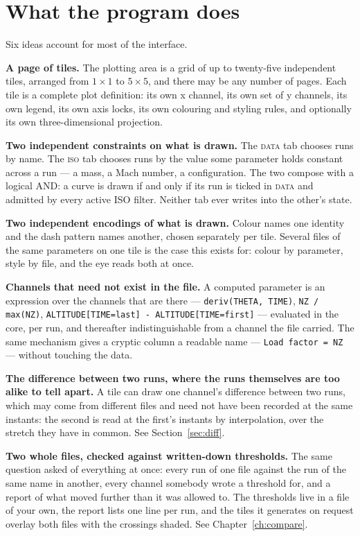 \documentclass[11pt,a4paper,oneside]{report}
\newcommand{\code}[1]{\texttt{#1}}
\newcommand{\tab}[1]{\textsc{#1}}
\begin{document}
\section{What the program does}

Six ideas account for most of the interface.

\textbf{A page of tiles.} The plotting area is a grid of up to twenty-five
independent tiles, arranged from $1 \times 1$ to $5 \times 5$, and there may be
any number of pages. Each tile is a complete plot definition: its own x channel,
its own set of y channels, its own legend, its own axis locks, its own colouring
and styling rules, and optionally its own three-dimensional projection.

\textbf{Two independent constraints on what is drawn.} The \tab{data} tab
chooses runs by name. The \tab{iso} tab chooses runs by the value some parameter
holds constant across a run --- a mass, a Mach number, a configuration. The two
compose with a logical AND: a curve is drawn if and only if its run is ticked in
\tab{data} and admitted by every active ISO filter. Neither tab ever writes into
the other's state.

\textbf{Two independent encodings of what is drawn.} Colour names one identity
and the dash pattern names another, chosen separately per tile. Several files of
the same parameters on one tile is the case this exists for: colour by
parameter, style by file, and the eye reads both at once.

\textbf{Channels that need not exist in the file.} A computed parameter is an
expression over the channels that are there ---
\code{deriv(THETA, TIME)}, \code{NZ / max(NZ)},
\code{ALTITUDE[TIME=last] - ALTITUDE[TIME=first]} --- evaluated in the core,
per run, and thereafter indistinguishable from a channel the file carried. The
same mechanism gives a cryptic column a readable name --- \code{Load factor =
NZ} --- without touching the data.

\textbf{The difference between two runs, where the runs themselves are too
alike to tell apart.} A tile can draw one channel's difference between two runs,
which may come from different files and need not have been recorded at the same
instants: the second is read at the first's instants by interpolation, over the
stretch they have in common. See Section~\ref{sec:diff}.

\textbf{Two whole files, checked against written-down thresholds.} The same
question asked of everything at once: every run of one file against the run of
the same name in another, every channel somebody wrote a threshold for, and a
report of what moved further than it was allowed to. The thresholds live in a
file of your own, the report lists one line per run, and the tiles it generates
on request overlay both files with the crossings shaded. See
Chapter~\ref{ch:compare}.
\end{document}
